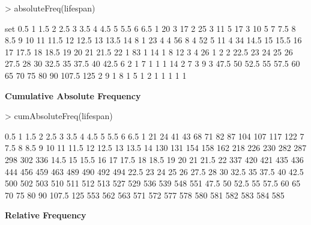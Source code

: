 \documentclass[a4paper]{article}
\begin{document}
\begin{Schunk}
\begin{Sinput}
> absoluteFreq(lifespan)
\end{Sinput}
\begin{Soutput}
set
  0.5     1   1.5     2   2.5     3   3.5     4   4.5     5   5.5     6   6.5 
    1    20     3    17     2    25     3    11     5    17     3    10     5 
    7   7.5     8   8.5     9    10    11  11.5    12  12.5    13  13.5    14 
    8     1    23     4     4    56     8     4    52     5    11     4    34 
 14.5    15  15.5    16    17  17.5    18  18.5    19    20    21  21.5    22 
    1    83     1    14     1     8    12     3     4    26     1     2     2 
 22.5    23    24    25    26  27.5    28    30  32.5    35  37.5    40  42.5 
    6     2     1     7     1     1     1    14     2     7     3     9     3 
 47.5    50  52.5    55  57.5    60    65    70    75    80    90 107.5   125 
    2     9     1     8     1     5     1     2     1     1     1     1     1 
\end{Soutput}
\end{Schunk}


\textbf{Cumulative Absolute Frequency}

\begin{Schunk}
\begin{Sinput}
> cumAbsoluteFreq(lifespan)
\end{Sinput}
\begin{Soutput}
  0.5     1   1.5     2   2.5     3   3.5     4   4.5     5   5.5     6   6.5 
    1    21    24    41    43    68    71    82    87   104   107   117   122 
    7   7.5     8   8.5     9    10    11  11.5    12  12.5    13  13.5    14 
  130   131   154   158   162   218   226   230   282   287   298   302   336 
 14.5    15  15.5    16    17  17.5    18  18.5    19    20    21  21.5    22 
  337   420   421   435   436   444   456   459   463   489   490   492   494 
 22.5    23    24    25    26  27.5    28    30  32.5    35  37.5    40  42.5 
  500   502   503   510   511   512   513   527   529   536   539   548   551 
 47.5    50  52.5    55  57.5    60    65    70    75    80    90 107.5   125 
  553   562   563   571   572   577   578   580   581   582   583   584   585 
\end{Soutput}
\end{Schunk}


\textbf{Relative Frequency}
\end{document}
